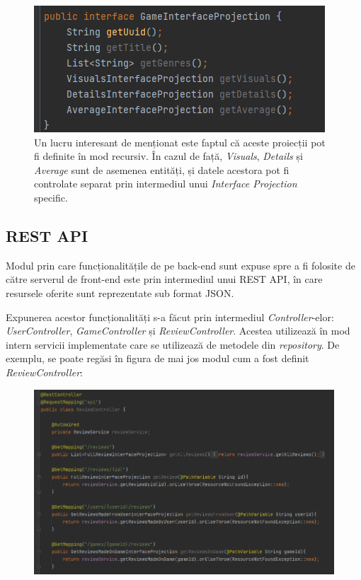 \documentclass[12pt,a4paper]{report}
\begin{document}
\begin{figure}[H]
\centering
\caption{}
\includegraphics[scale = 1]{exemplu_20_interface_projection}
\caption*{Un lucru interesant de menționat este faptul că aceste proiecții pot fi definite în mod recursiv. În cazul de față, \emph{Visuals}, \emph{Details} și \emph{Average} sunt de asemenea entități, și datele acestora pot fi controlate separat prin intermediul unui \emph{Interface Projection} specific.}
\end{figure}


\subsection{REST API}

Modul prin care funcționalitățile de pe back-end sunt expuse spre a fi folosite de către serverul de front-end este prin intermediul unui REST API, în care resursele oferite sunt reprezentate sub format JSON.

Expunerea acestor funcționalități s-a făcut prin intermediul \emph{Controller}-elor: \emph{UserController}, \emph{GameController} și \emph{ReviewController}. Acestea utilizează în mod intern servicii implementate care se utilizează de metodele din \emph{repository}. De exemplu, se poate regăsi în figura de mai jos modul cum a fost definit \emph{ReviewController}:

\begin{figure}[H]
\centering
\caption{}
\includegraphics[scale = 0.7]{exemplu_21_review_controller}
\caption*{}
\end{figure}
\end{document}

